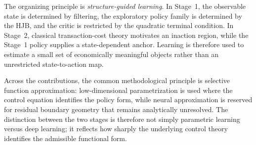 \documentclass[a4paper,10pt]{article}
\begin{document}
The organizing principle is \emph{structure-guided learning}. In Stage~1, the observable state is determined by filtering, the exploratory policy family is determined by the HJB, and the critic is restricted by the quadratic terminal condition. In Stage~2, classical transaction-cost theory motivates an inaction region, while the Stage~1 policy supplies a state-dependent anchor. Learning is therefore used to estimate a small set of economically meaningful objects rather than an unrestricted state-to-action map.

Across the contributions, the common methodological principle is selective function approximation: low-dimensional parametrization is used where the control equation identifies the policy form, while neural approximation is reserved for residual boundary geometry that remains analytically unresolved. The distinction between the two stages is therefore not simply parametric learning versus deep learning; it reflects how sharply the underlying control theory identifies the admissible functional form.
\end{document}
